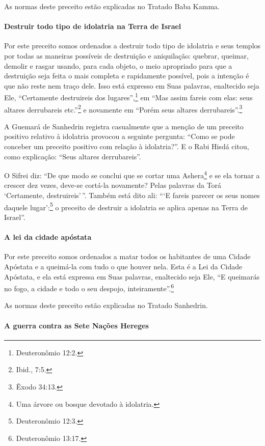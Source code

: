 As normas deste preceito estão explicadas no Tratado Baba Kamma.

\paragraph{Destruir todo tipo de idolatria na Terra de Israel}

Por este preceito somos ordenados a destruir todo tipo de idolatria e
seus templos por todas as maneiras possíveis de destruição e
aniquilação: quebrar, queimar, demolir e rasgar usando, para cada
objeto, o meio apropriado para que a destruição seja feita o mais
completa e rapidamente possível, pois a intenção é que não reste nem
traço dele. Isso está expresso em Suas palavras, enaltecido seja Ele,
``Certamente destruireis dos lugares'',\footnote{Deuteronômio 12:2.} em ``Mas
assim fareis com elas: seus altares derrubareis etc.''\footnote{Ibid., 7:5.} e
novamente em ``Porém seus altares derrubareis''.\footnote{Êxodo 34:13.}

A Guemará de Sanhedrin registra casualmente que a menção de um preceito
positivo relativo à idolatria provocou a seguinte pergunta: ``Como se
pode conceber um preceito positivo com relação à idolatria?''. E o Rabi
Hisdá citou, como explicação: ``Seus altares derrubareis''.

O Sifrei diz: ``De que modo se conclui que se cortar uma
Ashera\footnote{Uma árvore ou bosque devotado à idolatria.}
e se ela tornar a crescer dez vezes, deve-se cortá-la novamente? Pelas
palavras da Torá `Certamente, destruireis'\,''. Também está dito ali:
```E fareis parecer os seus nomes daquele lugar':\footnote{Deuteronômio 12:3.} o
preceito de destruir a idolatria se aplica apenas na Terra de Israel''.

\paragraph{A lei da cidade apóstata}

Por este preceito somos ordenados a matar todos os habitantes de uma
Cidade Apóstata e a queimá-la com tudo o que houver nela. Esta é a Lei
da Cidade Apóstata, e ela está expressa em Suas palavras, enaltecido
seja Ele, ``E queimarás no fogo, a cidade e todo o seu despojo,
inteiramente''.\footnote{Deuteronômio 13:17.}

As normas deste preceito estão explicadas no Tratado Sanhedrin.

\paragraph{A guerra contra as Sete Nações Hereges}

